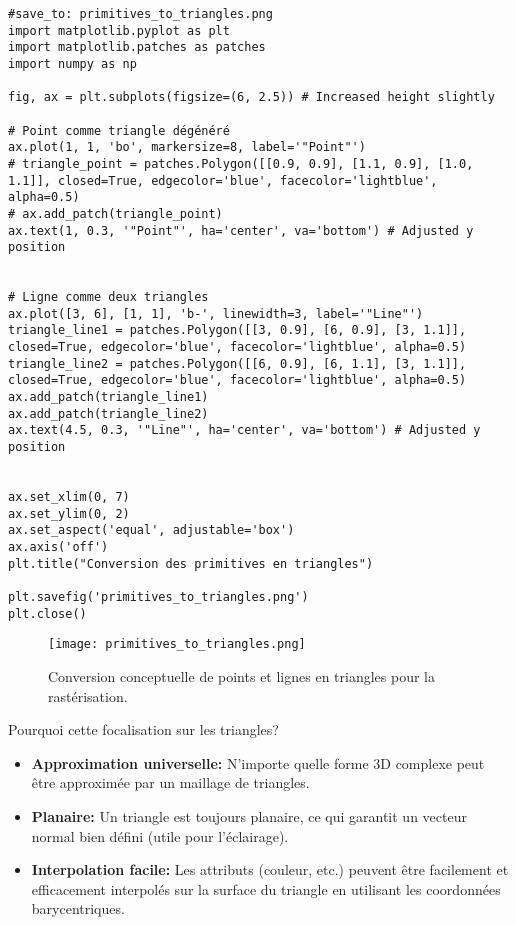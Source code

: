 \documentclass{article}
\begin{document}
\begin{verbatim}
#save_to: primitives_to_triangles.png
import matplotlib.pyplot as plt
import matplotlib.patches as patches
import numpy as np

fig, ax = plt.subplots(figsize=(6, 2.5)) # Increased height slightly

# Point comme triangle dégénéré
ax.plot(1, 1, 'bo', markersize=8, label='"Point"')
# triangle_point = patches.Polygon([[0.9, 0.9], [1.1, 0.9], [1.0, 1.1]], closed=True, edgecolor='blue', facecolor='lightblue', alpha=0.5)
# ax.add_patch(triangle_point)
ax.text(1, 0.3, '"Point"', ha='center', va='bottom') # Adjusted y position


# Ligne comme deux triangles
ax.plot([3, 6], [1, 1], 'b-', linewidth=3, label='"Line"')
triangle_line1 = patches.Polygon([[3, 0.9], [6, 0.9], [3, 1.1]], closed=True, edgecolor='blue', facecolor='lightblue', alpha=0.5)
triangle_line2 = patches.Polygon([[6, 0.9], [6, 1.1], [3, 1.1]], closed=True, edgecolor='blue', facecolor='lightblue', alpha=0.5)
ax.add_patch(triangle_line1)
ax.add_patch(triangle_line2)
ax.text(4.5, 0.3, '"Line"', ha='center', va='bottom') # Adjusted y position


ax.set_xlim(0, 7)
ax.set_ylim(0, 2)
ax.set_aspect('equal', adjustable='box')
ax.axis('off')
plt.title("Conversion des primitives en triangles")

plt.savefig('primitives_to_triangles.png')
plt.close()
\end{verbatim}

\begin{figure}[H]
\centering
\texttt{[image: primitives\_to\_triangles.png]}
\caption{Conversion conceptuelle de points et lignes en triangles pour la rastérisation.}
\label{fig:primitives_to_triangles}
\end{figure}

Pourquoi cette focalisation sur les triangles?
\begin{itemize}
    \item \textbf{Approximation universelle:} N'importe quelle forme 3D complexe peut être approximée par un maillage de triangles.
    \item \textbf{Planaire:} Un triangle est toujours planaire, ce qui garantit un vecteur normal bien défini (utile pour l'éclairage).
    \item \textbf{Interpolation facile:} Les attributs (couleur, etc.) peuvent être facilement et efficacement interpolés sur la surface du triangle en utilisant les coordonnées barycentriques.
\end{itemize}
\end{document}

